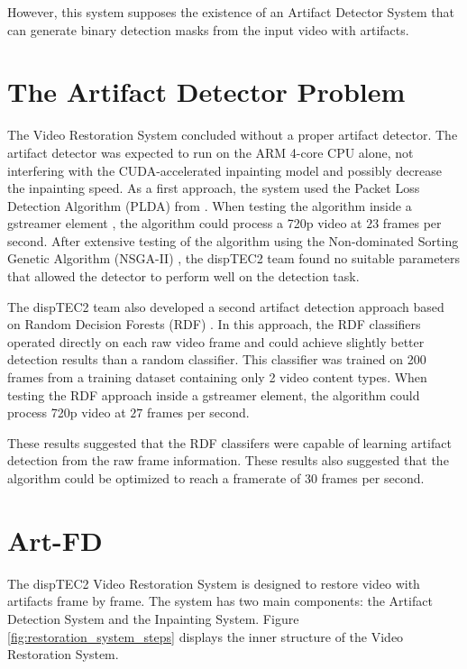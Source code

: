 However, this system supposes the existence of an Artifact Detector System that can generate binary detection masks from the input video with artifacts.

\section{The Artifact Detector Problem}
\label{sec:intro_problem}

The Video Restoration System concluded without a proper artifact detector. The artifact detector was expected to run on the ARM 4-core CPU alone, not interfering with the CUDA-accelerated inpainting model and possibly decrease the inpainting speed. As a first approach, the system used the Packet Loss Detection Algorithm (PLDA) from \cite{Vranjes2018}. When testing the algorithm inside a gstreamer element \cite{gstreamer}, the algorithm could process a 720p video at $23$ frames per second.  After extensive testing of the algorithm using the Non-dominated Sorting Genetic Algorithm (NSGA-II) \cite{Deb2002}, the dispTEC2 team found no suitable parameters that allowed the detector to perform well on the detection task. 

The dispTEC2 team also developed a second artifact detection approach based on Random Decision Forests (RDF) \cite{Breiman2001}. In this approach, the RDF classifiers operated directly on each raw video frame and could achieve slightly better detection results than a random classifier. This classifier was trained on 200 frames from a training dataset containing only 2 video content types. When testing the RDF approach inside a gstreamer element, the algorithm could process 720p video at $27$ frames per second.

These results suggested that the RDF classifers were capable of learning artifact detection from the raw frame information. These results also suggested that the algorithm could be optimized to reach a framerate of $30$ frames per second.


\section{Art-FD}
\label{sec:intro_detector}

The dispTEC2 Video Restoration System is designed to restore video with artifacts frame by frame. The system has two main components: the Artifact Detection System and the Inpainting System. Figure \ref{fig:restoration_system_steps} displays the inner structure of the Video Restoration System.

